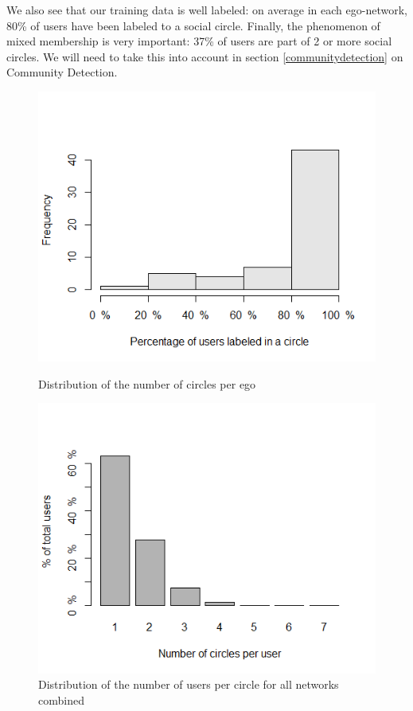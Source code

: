 \documentclass[11pt]{article}       %
\begin{document}
We also see that our training data is well labeled: on average in each ego-network, 80\% of users have been labeled to a social circle. Finally, the phenomenon of mixed membership is very important: 37\% of users are part of 2 or more social circles. We will need to take this into account in section \ref{communitydetection} on Community Detection.

\begin{figure}[H]
\centering
\begin{minipage}[b]{0.47\linewidth}
\vspace{0pt}
\includegraphics[width=0.9\linewidth]{completecirclelabel.png}
\caption{Distribution of the number of circles per ego}
\end{minipage}
\hspace{0.5cm}
\begin{minipage}[b]{0.47\linewidth}
\centering
\includegraphics[width=0.9\linewidth]{overlap.png}
\caption{Distribution of the number of users per circle for all networks combined}
\end{minipage}
\end{figure}
\end{document}
